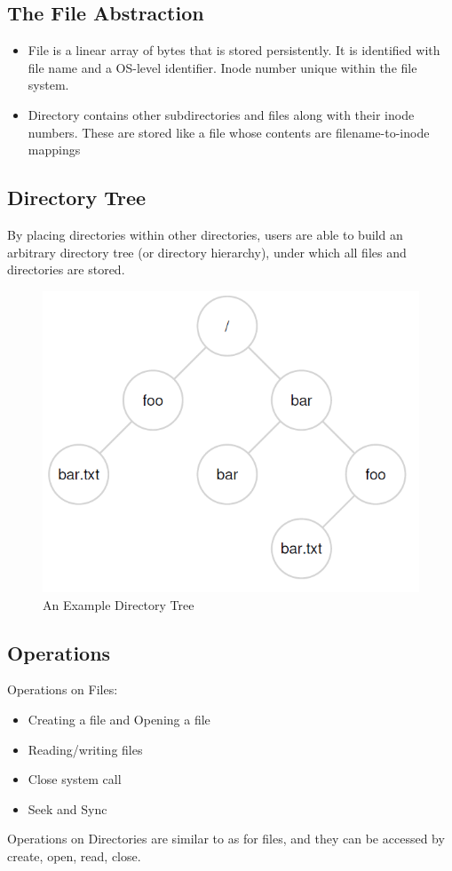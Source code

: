 \documentclass{article}
\begin{document}
\subsection{The File Abstraction}
\begin{itemize}
    \item File is a linear array of bytes that is stored persistently. It is identified with file name and a OS-level identifier. Inode number unique within the file system.
    \item Directory contains other subdirectories and files along with their inode numbers. These are stored like a file whose contents are filename-to-inode mappings
\end{itemize}
\subsection{Directory Tree}
By placing directories within other directories, users are able to build an arbitrary directory tree (or directory hierarchy), under which all files and directories are stored.
    \begin{figure}[ht]
    \centering
    \includegraphics[scale =0.3]{img/DirectoryTree.png}
    \caption{An Example Directory Tree}
    \end{figure}
\subsection{Operations}
Operations on Files:
\begin{itemize}
    \item Creating a file and Opening a file
    \item Reading/writing files
    \item Close system call
    \item Seek and Sync
\end{itemize}
Operations on Directories are similar to as for files, and they can be accessed by create, open, read, close. 
\end{document}
